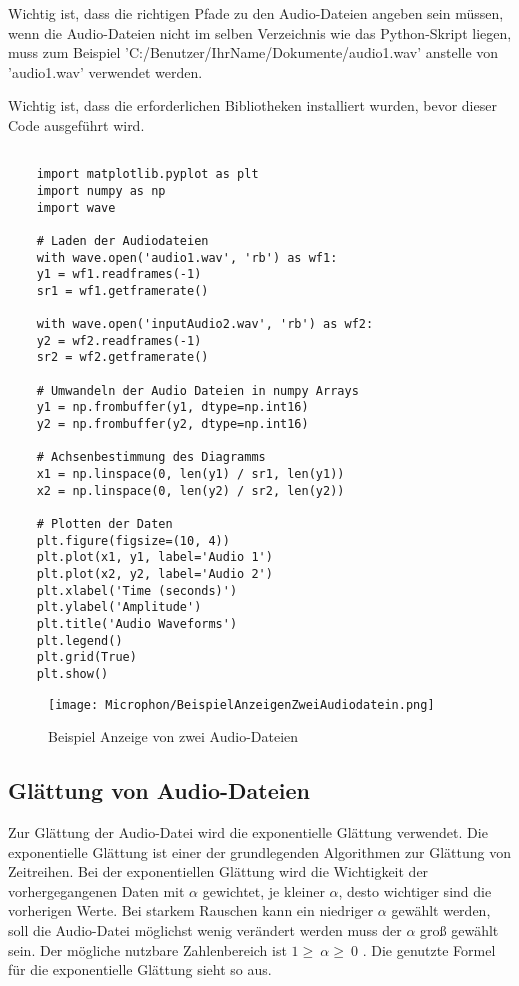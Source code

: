 Wichtig ist, dass die richtigen Pfade zu den Audio-Dateien angeben sein müssen, wenn die Audio-Dateien nicht im selben Verzeichnis wie das Python-Skript liegen, muss zum Beispiel 'C:/Benutzer/IhrName/Dokumente/audio1.wav' anstelle von 'audio1.wav' verwendet werden.

Wichtig ist, dass die erforderlichen Bibliotheken installiert wurden, bevor dieser Code ausgeführt wird. 

\begin{verbatim}
    
    import matplotlib.pyplot as plt
    import numpy as np
    import wave
    
    # Laden der Audiodateien
    with wave.open('audio1.wav', 'rb') as wf1:
    y1 = wf1.readframes(-1)
    sr1 = wf1.getframerate()
    
    with wave.open('inputAudio2.wav', 'rb') as wf2:
    y2 = wf2.readframes(-1)
    sr2 = wf2.getframerate()
    
    # Umwandeln der Audio Dateien in numpy Arrays
    y1 = np.frombuffer(y1, dtype=np.int16)
    y2 = np.frombuffer(y2, dtype=np.int16)
    
    # Achsenbestimmung des Diagramms
    x1 = np.linspace(0, len(y1) / sr1, len(y1))
    x2 = np.linspace(0, len(y2) / sr2, len(y2))
    
    # Plotten der Daten
    plt.figure(figsize=(10, 4))
    plt.plot(x1, y1, label='Audio 1')
    plt.plot(x2, y2, label='Audio 2')
    plt.xlabel('Time (seconds)')
    plt.ylabel('Amplitude')
    plt.title('Audio Waveforms')
    plt.legend()
    plt.grid(True)
    plt.show()
\end{verbatim}
\begin{figure} [ht]
    \centering
    \texttt{[image: Microphon/BeispielAnzeigenZweiAudiodatein.png]}
    \caption{Beispiel Anzeige von zwei Audio-Dateien}
    \label{fig:glättung}
\end{figure}

\subsection{Glättung von Audio-Dateien}

Zur Glättung der Audio-Datei wird die exponentielle Glättung verwendet. 
Die exponentielle Glättung ist einer der grundlegenden Algorithmen zur Glättung von Zeitreihen.
Bei der exponentiellen Glättung wird die Wichtigkeit der vorhergegangenen Daten mit $\alpha$ gewichtet, je kleiner $\alpha$, desto wichtiger sind die vorherigen Werte. 
Bei starkem Rauschen kann ein niedriger $\alpha$ gewählt werden, soll die Audio-Datei möglichst wenig verändert werden muss der $\alpha$ groß gewählt sein. 
Der mögliche nutzbare Zahlenbereich ist $ 1 \geq\ \alpha \geq\ 0 $ . 
Die genutzte Formel für die exponentielle Glättung sieht so aus. 

